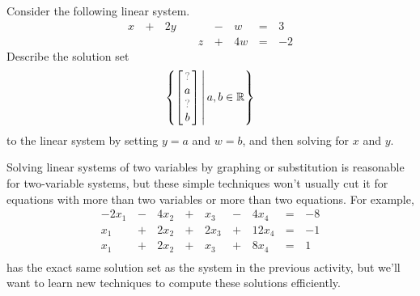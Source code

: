 \begin{activity}{10}
  Consider the following linear system.
  \begin{alignat*}{5}
    x &\,+\,& 2y &\, \,&     &\,-\,&  w &\,=\,& 3 \\
        &\, \,&      &\, \,& z &\,+\,& 4w &\,=\,& -2
  \end{alignat*}
  Describe the solution set
  \[
  	\setBuilder
    {
    	\begin{bmatrix}
          \unknown \\
          a \\
          \unknown \\
          b
    	\end{bmatrix}
    }{
      a,b \in \IR
    }
  \]
  to the linear system
  by setting \(y=a\) and \(w=b\), and then solving for \(x\) and
  \(y\).
\end{activity}

\begin{observation}
  Solving linear systems of two variables by graphing or substitution is
  reasonable for two-variable systems, but these simple techniques
  won't usually cut it for equations with
  more than two variables or more than two equations. For example,
  \begin{alignat*}{5}
    -2x_1 &\,-\,& 4x_2 &\,+\,&  x_3 &\,-\,&  4x_4 &\,=\,& -8 \\
      x_1 &\,+\,& 2x_2 &\,+\,& 2x_3 &\,+\,& 12x_4 &\,=\,& -1 \\
      x_1 &\,+\,& 2x_2 &\,+\,&  x_3 &\,+\,&  8x_4 &\,=\,&  1 \\
  \end{alignat*}
  has the exact same solution set as the system in the previous
  activity, but we'll want to learn new techniques
  to compute these solutions efficiently.
\end{observation}





